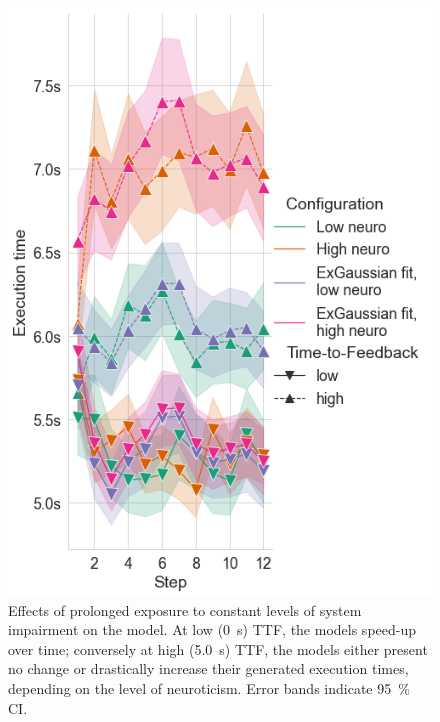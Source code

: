 \begin{figure}
    \centering
    \includegraphics[width=\columnwidth]{figs/new_model/exectime_over_steps.png}
    \caption{%
    Effects of prolonged exposure to constant levels of system impairment on the model.
    At low (\SI{0}{\second}) \ac{TTF}, the models speed-up over time; conversely at high (\SI{5.0}{\second}) \ac{TTF}, the models either present no change or drastically increase their generated execution times, depending on the level of neuroticism.
    Error bands indicate \SI{95}{\percent} \ac{CI}.
    }\label{fig:exectimeduration}
\end{figure}


